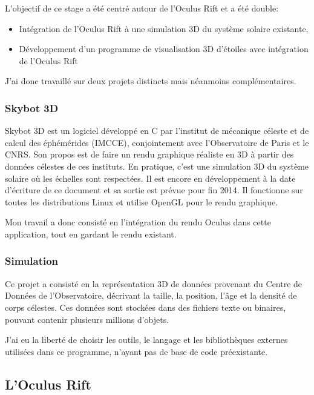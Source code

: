 \documentclass[a4paper,french,12pt]{article}
\begin{document}
		L’objectif de ce stage a été centré autour de l'Oculus Rift et a été double:
		\begin{itemize}
		 \item Intégration de l'Oculus Rift à une simulation 3D du système solaire existante,
		 \item Développement d'un programme de visualisation 3D  d'étoiles avec intégration de l'Oculus Rift
		\end{itemize}
		
		J'ai donc travaillé sur deux projets distincts mais néanmoins complémentaires.
		
	    \subsubsection{Skybot 3D}
		Skybot 3D est un logiciel développé en C par l'institut de mécanique céleste et de calcul des éphémérides (IMCCE),
		conjointement avec l'Observatoire de Paris et le CNRS. Son propos est de faire un rendu graphique réaliste
		en 3D à partir des données célestes de ces instituts. En pratique, c'est une simulation 3D du système solaire
		où les échelles sont respectées. Il est encore en développement à la date d'écriture de ce document et
		sa sortie est prévue pour fin 2014.
		Il fonctionne sur toutes les distributions Linux et utilise OpenGL pour le rendu graphique.
		
		Mon travail a donc consisté en l'intégration du rendu Oculus dans cette application, tout en gardant
		le rendu existant.
		
	    \subsubsection{Simulation}
		Ce projet a consisté en la représentation 3D de données provenant du Centre de Données
		de l'Observatoire, décrivant la taille, la position, l'âge et la densité de corps célestes.
		Ces données sont stockées dans des fichiers texte ou binaires, pouvant contenir plusieurs millions
		d'objets.
		
		J'ai eu la liberté de choisir les outils, le langage et les bibliothèques  externes utilisées dans ce programme,
		n'ayant pas de base de code préexistante.
		
	
	\subsection{L'Oculus Rift}
		
\end{document}
